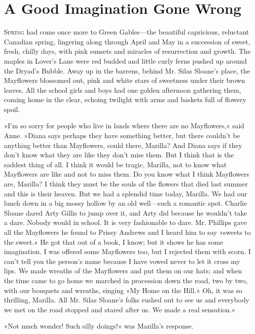 \chapter{A Good Imagination Gone Wrong}

\lettrine[lines=4]{S}{pring} had come once more to Green Gables—the beautiful capricious, reluctant Canadian spring, lingering along through April and May in a succession of sweet, fresh, chilly days, with pink sunsets and miracles of resurrection and growth. The maples in Lover’s Lane were red budded and little curly ferns pushed up around the Dryad’s Bubble. Away up in the barrens, behind Mr. Silas Sloane’s place, the Mayflowers blossomed out, pink and white stars of sweetness under their brown leaves. All the school girls and boys had one golden afternoon gathering them, coming home in the clear, echoing twilight with arms and baskets full of flowery spoil.

»I’m so sorry for people who live in lands where there are no Mayflowers,« said Anne. »Diana says perhaps they have something better, but there couldn’t be anything better than Mayflowers, could there, Marilla? And Diana says if they don’t know what they are like they don’t miss them. But I think that is the saddest thing of all. I think it would be tragic, Marilla, not to know what Mayflowers are like and not to miss them. Do you know what I think Mayflowers are, Marilla? I think they must be the souls of the flowers that died last summer and this is their heaven. But we had a splendid time today, Marilla. We had our lunch down in a big mossy hollow by an old well—such a romantic spot. Charlie Sloane dared Arty Gillis to jump over it, and Arty did because he wouldn’t take a dare. Nobody would in school. It is very fashionable to dare. Mr. Phillips gave all the Mayflowers he found to Prissy Andrews and I heard him to say »sweets to the sweet.« He got that out of a book, I know; but it shows he has some imagination. I was offered some Mayflowers too, but I rejected them with scorn. I can’t tell you the person’s name because I have vowed never to let it cross my lips. We made wreaths of the Mayflowers and put them on our hats; and when the time came to go home we marched in procession down the road, two by two, with our bouquets and wreaths, singing »My Home on the Hill.« Oh, it was so thrilling, Marilla. All Mr. Silas Sloane’s folks rushed out to see us and everybody we met on the road stopped and stared after us. We made a real sensation.«

»Not much wonder! Such silly doings!« was Marilla’s response.

